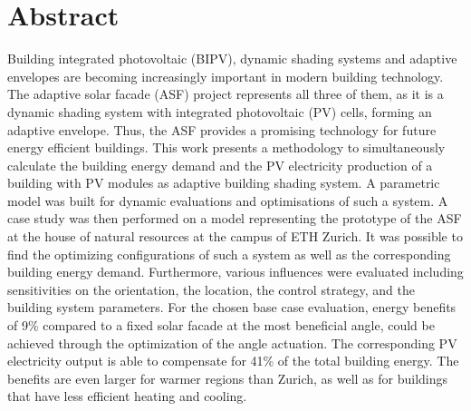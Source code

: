\chapter*{Abstract}
Building integrated photovoltaic (BIPV), dynamic shading systems and adaptive envelopes are becoming increasingly important in modern building technology. The adaptive solar facade (ASF) project represents all three of them, as it is a dynamic shading system with integrated photovoltaic (PV) cells, forming an adaptive envelope. Thus, the ASF provides a promising technology for future energy efficient buildings. This work presents a methodology to simultaneously calculate the building energy demand and the PV electricity production of a building with PV modules as adaptive building shading system. A parametric model was built for dynamic evaluations and optimisations of such a system. A case study was then performed on a model representing the prototype of the ASF at the house of natural resources at the campus of ETH Zurich. It was possible to find the optimizing configurations of such a system as well as the corresponding building energy demand. Furthermore, various influences were evaluated including sensitivities on the orientation, the location, the control strategy, and the building system parameters. For the chosen base case evaluation, energy benefits of 9\% compared to a fixed solar facade at the most beneficial angle, could be achieved through the optimization of the angle actuation. The corresponding PV electricity output is able to compensate for 41\% of the total building energy. The benefits are even larger for warmer regions than Zurich, as well as for buildings that have less efficient heating and cooling. 
\newpage